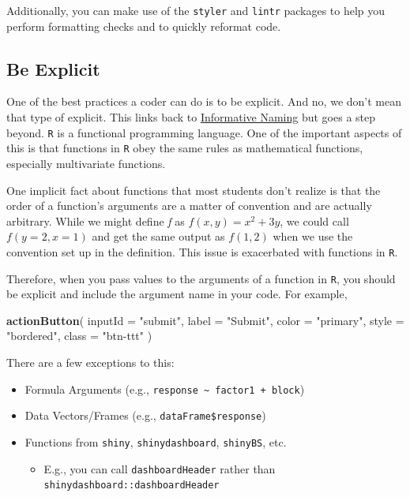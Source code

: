 \documentclass[
]{book}
\newenvironment{Shaded}{\begin{snugshade}}{\end{snugshade}}
\newcommand{\DataTypeTok}[1]{\textcolor[rgb]{0.13,0.29,0.53}{#1}}
\newcommand{\KeywordTok}[1]{\textcolor[rgb]{0.13,0.29,0.53}{\textbf{#1}}}
\newcommand{\NormalTok}[1]{#1}
\newcommand{\StringTok}[1]{\textcolor[rgb]{0.31,0.60,0.02}{#1}}
\providecommand{\tightlist}{%
  \setlength{\itemsep}{0pt}\setlength{\parskip}{0pt}}
\begin{document}
Additionally, you can make use of the \texttt{styler} and \texttt{lintr} packages to help you perform formatting checks and to quickly reformat code.

\hypertarget{explicitb}{%
\subsection{Be Explicit}\label{explicitb}}

One of the best practices a coder can do is to be explicit. And no, we don't mean that type of explicit. This links back to \protect\hyperlink{naming}{Informative Naming} but goes a step beyond. \texttt{R} is a functional programming language. One of the important aspects of this is that functions in \texttt{R} obey the same rules as mathematical functions, especially multivariate functions.

One implicit fact about functions that most students don't realize is that the order of a function's arguments are a matter of convention and are actually arbitrary. While we might define \emph{f} as \(f(x,y) = x^2+3y\), we could call \(f(y=2,x=1)\) and get the same output as \(f(1,2)\) when we use the convention set up in the definition. This issue is exacerbated with functions in \texttt{R}.

Therefore, when you pass values to the arguments of a function in \texttt{R}, you should be explicit and include the argument name in your code. For example,

\begin{Shaded}
\begin{Highlighting}[]
\KeywordTok{actionButton}\NormalTok{(}
  \DataTypeTok{inputId =} \StringTok{"submit"}\NormalTok{,}
  \DataTypeTok{label =} \StringTok{"Submit"}\NormalTok{,}
  \DataTypeTok{color =} \StringTok{"primary"}\NormalTok{,}
  \DataTypeTok{style =} \StringTok{"bordered"}\NormalTok{,}
  \DataTypeTok{class =} \StringTok{"btn-ttt"}
\NormalTok{)}
\end{Highlighting}
\end{Shaded}

There are a few exceptions to this:

\begin{itemize}
\tightlist
\item
  Formula Arguments (e.g., \texttt{response\ \textasciitilde{}\ factor1\ +\ block})
\item
  Data Vectors/Frames (e.g., \texttt{dataFrame\$response})
\item
  Functions from \texttt{shiny}, \texttt{shinydashboard}, \texttt{shinyBS}, etc.

  \begin{itemize}
  \tightlist
  \item
    E.g., you can call \texttt{dashboardHeader} rather than \texttt{shinydashboard::dashboardHeader}
  \end{itemize}
\end{itemize}
\end{document}
